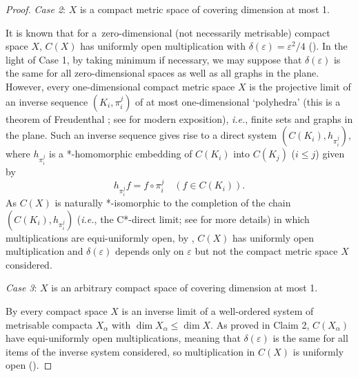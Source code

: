 \documentclass[12pt,fleqn]{amsart}
\theoremstyle{definition}
\numberwithin{equation}{section}
\theoremstyle{remark}
\begin{document}
\begin{proof}
    \noindent \emph{Case 2}: $X$ is a compact metric space of covering dimension at most 1. \smallskip 
    
    It is known that for a~zero-dimensional (not necessarily metrisable) compact space $X$, $C(X)$ has uniformly open multiplication with $\delta(\varepsilon) = \varepsilon^2 / 4$ (\cite[Proposition 4.6]{DraKa}). In the light of Case 1, by taking minimum if necessary, we may suppose that $\delta(\varepsilon)$ is the same for all zero-dimensional spaces as well as all graphs in the plane. However, every one-dimensional compact metric space $X$ is the projective limit of an inverse sequence $(K_i, \pi_i^j)$ of at most one-dimensional `polyhedra' (this is a theorem of Freudenthal \cite{freudenthal1937entwicklungen}; see \cite[Theorem 1.13.2]{engelking1978dimension} for modern exposition), \emph{i.e.}, finite sets and graphs in the plane. Such an inverse sequence gives rise to a direct system $(C(K_i), h_{\pi_i^j})$, where $h_{\pi_i^j}$ is a *-homomorphic embedding of $C(K_i)$ into $C(K_j)$ ($i\leqslant j$) given by 
    \[
        h_{\pi_i^j}f = f\circ \pi_i^j\quad (f\in C(K_i)).
    \]
    As $C(X)$ is naturally *-isomorphic to the completion of the chain $(C(K_i), h_{\pi_i^j})$ (\emph{i.e.}, the C*-direct limit; see \cite[Section 1]{takeda1955inductive} for more details) in which multiplications are equi-uniformly open, by \cite[Corollary 3.6]{DraKa}, $C(X)$ has uniformly open multiplication and $\delta(\varepsilon)$ depends only on $\varepsilon$ but not the compact metric space $X$ considered.\medskip

    \noindent\emph{Case 3}: $X$ is an arbitrary compact space of covering dimension at most 1.\smallskip

    By \cite[Theorem 1]{mardevsic1960covering} every compact space $X$ is an inverse limit of a well-ordered system of metrisable compacta $X_{\alpha}$ with $\dim X_{\alpha} \leqslant \dim X.$ As proved in Claim 2, $C(X_\alpha)$ have equi-uniformly open multiplications, meaning that $\delta(\varepsilon)$ is the same for all items of the inverse system considered, so multiplication in $C(X)$ is uniformly open (\cite[Corollary 3.6]{DraKa}).
 
\end{proof}
\end{document}
